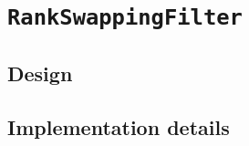 \section{\texttt{RankSwappingFilter}}
\label{Implementation:RankSwapping}

\subsection{Design}
\label{Implementation:RankSwapping:Design}

\subsection{Implementation details}
\label{Implementation:RankSwapping:Details}
